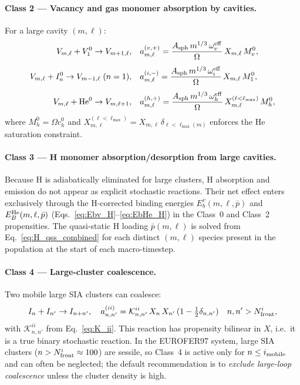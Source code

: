 \documentclass[pdflatex,sn-basic]{sn-jnl} %
\begin{document}
\paragraph{Class 2 --- Vacancy and gas monomer absorption by cavities.}
For a large cavity $(m,\ell)$:
\begin{align}
    V_{m,\ell} + V_1^0 \to V_{m+1,\ell},
    &\quad
    a_{m,\ell}^{(v,+)}
    = \frac{A_{\rm sph}\,m^{1/3}\,\omega_v^{\rm eff}}{\Omega}\,
      X_{m,\ell}\,M_v^0,
    \label{eq:r2_v}\\[4pt]
    V_{m,\ell} + I_n^0 \to V_{m-1,\ell} \;(n=1),
    &\quad
    a_{m,\ell}^{(i,-)}
    = \frac{A_{\rm sph}\,m^{1/3}\,\omega_i^{\rm eff}}{\Omega}\,
      X_{m,\ell}\,M_1^0,
    \label{eq:r2_i}\\[4pt]
    V_{m,\ell} + \mathrm{He}^0 \to V_{m,\ell+1},
    &\quad
    a_{m,\ell}^{(h,+)}
    = \frac{A_{\rm sph}\,m^{1/3}\,\omega_h^{\rm eff}}{\Omega}\,
      X_{m,\ell}^{(\ell < \ell_{\max})}\,M_h^0,
    \label{eq:r2_h}
\end{align}
where $M_h^0 = \Omega c_h^0$ and
$X_{m,\ell}^{(\ell < \ell_{\max})} = X_{m,\ell}\,
\delta_{\ell < \ell_{\max}(m)}$ enforces the He saturation
constraint.

\paragraph{Class 3 --- H monomer absorption/desorption from large
cavities.}
Because H is adiabatically eliminated for large clusters, H
absorption and emission do not appear as explicit stochastic
reactions.  Their net effect enters exclusively through the
H-corrected binding energies
$E_b^v(m,\ell,\bar{p})$ and $E_B^{\rm He}(m,\ell,\bar{p})$
(Eqs.~\ref{eq:Ebv_H}--\ref{eq:EbHe_H}) in the Class~0 and
Class~2 propensities.  The quasi-static H loading
$\bar{p}(m,\ell)$ is solved from Eq.~\eqref{eq:H_qss_combined}
for each distinct $(m,\ell)$ species present in the population
at the start of each macro-timestep.

\paragraph{Class 4 --- Large-cluster coalescence.}
Two mobile large SIA clusters can coalesce:
\begin{equation}\label{eq:r4_coal}
    I_n + I_{n'} \to I_{n+n'},
    \quad
    a_{n,n'}^{(ii)}
    = \mathcal{K}_{n,n'}^{ii}\,X_n\,X_{n'}\,(1 - \tfrac{1}{2}\delta_{n,n'})
    \quad
    n,n' > N_{\rm front}^i,
\end{equation}
with $\mathcal{K}_{n,n'}^{ii}$ from Eq.~\eqref{eq:K_ii}.  This
reaction has propensity bilinear in $X$, i.e.\ it is a true
binary stochastic reaction.  In the EUROFER97 system, large SIA
clusters ($n > N_{\rm front}^i \approx 100$) are sessile, so
Class~4 is active only for $n \leq i_{\rm mobile}$ and can often be
neglected; the default recommendation is to \emph{exclude
large-loop coalescence} unless the cluster density is high.
\end{document}
